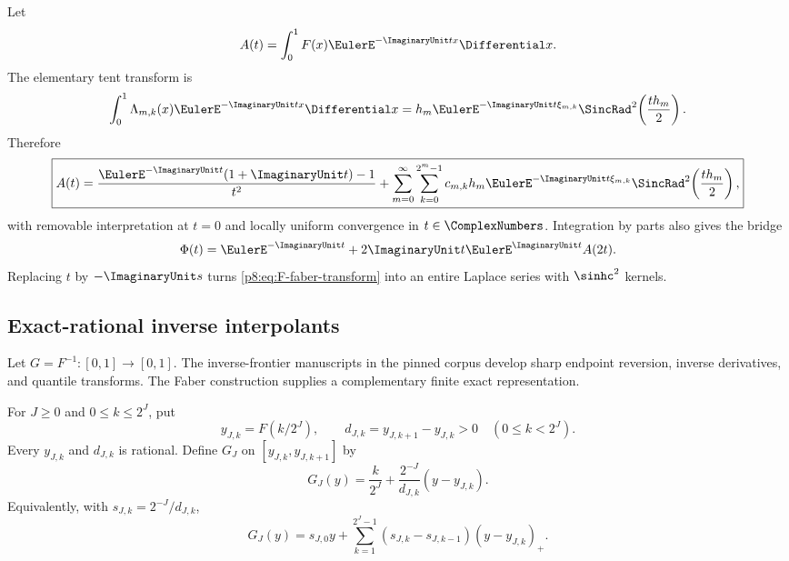 \documentclass[11pt]{article}
\theoremstyle{definition}
\theoremstyle{remark}
\begin{document}
Let
\begin{equation}
 A(t)=\int_0^1F(x)\EulerE^{-\ImaginaryUnit tx}\Differential x.                     \label{p8:eq:A-definition}
\end{equation}
The elementary tent transform is
\begin{equation}
 \int_0^1\Lambda_{m,k}(x)\EulerE^{-\ImaginaryUnit tx}\Differential x
 =h_m\EulerE^{-\ImaginaryUnit t\xi_{m,k}}
   \SincRad^2\!\left(\frac{th_m}{2}\right).                \label{p8:eq:tent-transform}
\end{equation}
Therefore
\begin{equation}
 \boxed{\displaystyle
 A(t)=\frac{\EulerE^{-\ImaginaryUnit t}(1+\ImaginaryUnit t)-1}{t^2}
 +\sum_{m=0}^\infty\sum_{k=0}^{2^m-1}
 c_{m,k}h_m\EulerE^{-\ImaginaryUnit t\xi_{m,k}}
 \SincRad^2\!\left(\frac{th_m}{2}\right),}                \label{p8:eq:F-faber-transform}
\end{equation}
with removable interpretation at $t=0$ and locally uniform convergence in
$t\in\ComplexNumbers$.  Integration by parts also gives the bridge
\begin{equation}
 \Phi(t)=\EulerE^{-\ImaginaryUnit t}+2\ImaginaryUnit t\EulerE^{\ImaginaryUnit t}A(2t).             \label{p8:eq:A-Phi-bridge}
\end{equation}
Replacing $t$ by $-\ImaginaryUnit s$ turns \eqref{p8:eq:F-faber-transform} into an entire
Laplace series with $\sinhc^2$ kernels.

\subsection{Exact-rational inverse interpolants}

Let $G=F^{-1}:[0,1]\to[0,1]$.  The inverse-frontier manuscripts in the
pinned corpus develop sharp endpoint reversion, inverse derivatives, and
quantile transforms.  The Faber construction supplies a complementary
finite exact representation.

For $J\ge0$ and $0\le k\le2^J$, put
\begin{equation}
 y_{J,k}=F(k/2^J),
 \qquad
 d_{J,k}=y_{J,k+1}-y_{J,k}>0
 \quad(0\le k<2^J).                                  \label{p8:eq:inverse-knots}
\end{equation}
Every $y_{J,k}$ and $d_{J,k}$ is rational.  Define $G_J$ on
$[y_{J,k},y_{J,k+1}]$ by
\begin{equation}
 G_J(y)=\frac{k}{2^J}
 +\frac{2^{-J}}{d_{J,k}}(y-y_{J,k}).                   \label{p8:eq:inverse-piecewise}
\end{equation}
Equivalently, with $s_{J,k}=2^{-J}/d_{J,k}$,
\begin{equation}
 G_J(y)=s_{J,0}y+
 \sum_{k=1}^{2^J-1}(s_{J,k}-s_{J,k-1})(y-y_{J,k})_+.  \label{p8:eq:inverse-hinge}
\end{equation}
\end{document}
